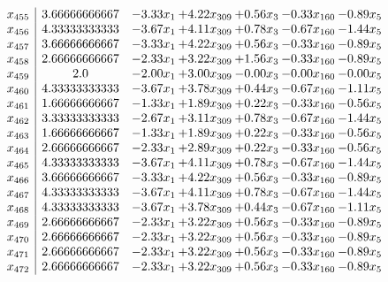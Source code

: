 \documentclass[8pt]{article}
\begin{document}
\[\begin{array}{c| c c@{\hskip 2pt} c@{\hskip 2pt} c@{\hskip 2pt} c@{\hskip 2pt} c@{\hskip 2pt} }
 x_{455}   &  3.66666666667 & -3.33 x_{1} & +  4.22 x_{309} & +  0.56 x_{3} & -0.33 x_{160} & -0.89 x_{5}\\
 x_{456}   &  4.33333333333 & -3.67 x_{1} & +  4.11 x_{309} & +  0.78 x_{3} & -0.67 x_{160} & -1.44 x_{5}\\
 x_{457}   &  3.66666666667 & -3.33 x_{1} & +  4.22 x_{309} & +  0.56 x_{3} & -0.33 x_{160} & -0.89 x_{5}\\
 x_{458}   &  2.66666666667 & -2.33 x_{1} & +  3.22 x_{309} & +  1.56 x_{3} & -0.33 x_{160} & -0.89 x_{5}\\
 x_{459}   &  2.0 & -2.00 x_{1} & +  3.00 x_{309} & -0.00 x_{3} & -0.00 x_{160} & -0.00 x_{5}\\
 x_{460}   &  4.33333333333 & -3.67 x_{1} & +  3.78 x_{309} & +  0.44 x_{3} & -0.67 x_{160} & -1.11 x_{5}\\
 x_{461}   &  1.66666666667 & -1.33 x_{1} & +  1.89 x_{309} & +  0.22 x_{3} & -0.33 x_{160} & -0.56 x_{5}\\
 x_{462}   &  3.33333333333 & -2.67 x_{1} & +  3.11 x_{309} & +  0.78 x_{3} & -0.67 x_{160} & -1.44 x_{5}\\
 x_{463}   &  1.66666666667 & -1.33 x_{1} & +  1.89 x_{309} & +  0.22 x_{3} & -0.33 x_{160} & -0.56 x_{5}\\
 x_{464}   &  2.66666666667 & -2.33 x_{1} & +  2.89 x_{309} & +  0.22 x_{3} & -0.33 x_{160} & -0.56 x_{5}\\
 x_{465}   &  4.33333333333 & -3.67 x_{1} & +  4.11 x_{309} & +  0.78 x_{3} & -0.67 x_{160} & -1.44 x_{5}\\
 x_{466}   &  3.66666666667 & -3.33 x_{1} & +  4.22 x_{309} & +  0.56 x_{3} & -0.33 x_{160} & -0.89 x_{5}\\
 x_{467}   &  4.33333333333 & -3.67 x_{1} & +  4.11 x_{309} & +  0.78 x_{3} & -0.67 x_{160} & -1.44 x_{5}\\
 x_{468}   &  4.33333333333 & -3.67 x_{1} & +  3.78 x_{309} & +  0.44 x_{3} & -0.67 x_{160} & -1.11 x_{5}\\
 x_{469}   &  2.66666666667 & -2.33 x_{1} & +  3.22 x_{309} & +  0.56 x_{3} & -0.33 x_{160} & -0.89 x_{5}\\
 x_{470}   &  2.66666666667 & -2.33 x_{1} & +  3.22 x_{309} & +  0.56 x_{3} & -0.33 x_{160} & -0.89 x_{5}\\
 x_{471}   &  2.66666666667 & -2.33 x_{1} & +  3.22 x_{309} & +  0.56 x_{3} & -0.33 x_{160} & -0.89 x_{5}\\
 x_{472}   &  2.66666666667 & -2.33 x_{1} & +  3.22 x_{309} & +  0.56 x_{3} & -0.33 x_{160} & -0.89 x_{5}\\

\end{array}\]
\end{document}
